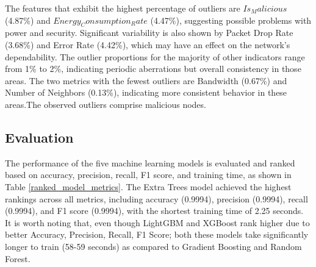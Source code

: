 \documentclass[runningheads]{llncs}
\begin{document}
The features that exhibit the highest percentage of outliers are $Is_Malicious$ (4.87\%) and $Energy_Consumption_Rate$ (4.47\%), suggesting possible problems with power and security. Significant variability is also shown by Packet Drop Rate (3.68\%) and Error Rate (4.42\%), which may have an effect on the network's dependability. The outlier proportions for the majority of other indicators range from 1\% to 2\%, indicating periodic aberrations but overall consistency in those areas. The two metrics with the fewest outliers are Bandwidth (0.67\%) and Number of Neighbors (0.13\%), indicating more consistent behavior in these areas.The observed outliers comprise malicious nodes.

\subsection{Evaluation}
The performance of the five machine learning models is evaluated and ranked based on accuracy, precision, recall, F1 score, and training time, as shown in Table \ref{ranked_model_metrics}. The Extra Trees model achieved the highest rankings across all metrics, including accuracy (0.9994), precision (0.9994), recall (0.9994), and F1 score (0.9994), with the shortest training time of 2.25 seconds. It is worth noting that, even though LightGBM and XGBoost rank higher due to better Accuracy, Precision, Recall, F1 Score; both these models take significantly longer to train (58-59 seconds) as compared to Gradient Boosting and Random Forest.

\begin{table}[htbp]
\centering
\caption{Ranked Models with Metrics}
\label{ranked_model_metrics}
\end{table}
\end{document}
